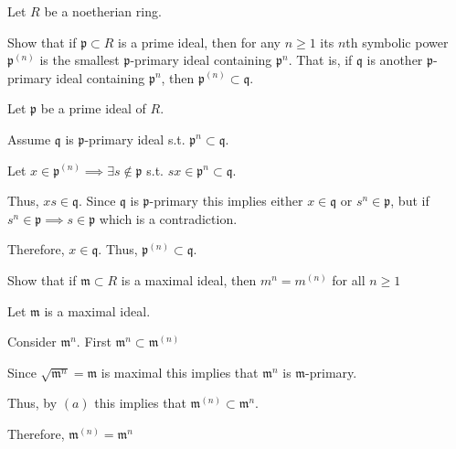 \documentclass[12pt, letterpaper]{article}
\newcommand{\p}{\mathfrak{p}}
\newcommand{\mf}[1]{\mathfrak{#1}}
\begin{document}
\begin{problem}{}
    Let $R$ be a noetherian ring.
\end{problem}
\begin{subproblem}{}
    Show that if $\p \subset R$ is a prime ideal, then for any $n \geq 1$ its $n$th symbolic power $\p^{(n)}$
is the smallest $\p$-primary ideal containing $\p^n$. That is, if $\mf{q}$ is another $\p$-primary ideal
containing $\p^n$, then $\p^{(n)} \subset \mf{q}$.
\end{subproblem}
\begin{problemproof}
    Let $\p$ be a prime ideal of $R$.

    Assume $\mf{q}$ is $\p$-primary ideal s.t. $\p^n \subset \mf{q}$.

    Let $x \in \p^{(n)} \implies \exists s \notin \p$ s.t. $sx \in \p^n \subset \mf{q}$.

    Thus, $xs \in \mf{q}$. Since $\mf{q}$ is $\p$-primary this implies either $x \in \mf{q}$ or $s^n \in \p$, but if $s^n \in \p \implies s \in \p$ which is a contradiction.

    Therefore, $x \in \mf{q}$. Thus, $\p^{(n)} \subset \mf{q}$.
\end{problemproof}

\begin{subproblem}{}
    Show that if $\mf{m} \subset R$ is a maximal ideal, then $m^n = m^{(n)}$ for all $n \geq 1$
\end{subproblem}
\begin{problemproof}
    Let $\mf{m}$ is a maximal ideal.

    Consider $\mf{m}^n$. First $\mf{m}^n \subset \mf{m}^{(n)}$
    
    Since $\sqrt{\mf{m}^n}=\mf{m}$ is maximal this implies that $\mf{m}^n$ is $\mf{m}$-primary.
    
    Thus, by $(a)$ this implies that $\mf{m}^{(n)} \subset \mf{m}^n$.

    Therefore, $\mf{m}^{(n)} = \mf{m}^n$
\end{problemproof}
\end{document}
